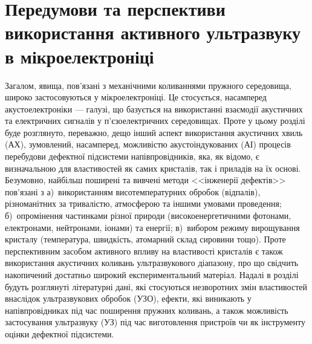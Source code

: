 \chapter{Передумови та перспективи використання активного ультразвуку в мікроелектроніці\label{Oglyad}}


Загалом, явища, пов'язані з механічними коливаннями пружного середовища, широко застосовуються у мікроелектроніці.
Це стосується, насамперед акустоелектроніки --- галузі, що базується на використанні взаємодії акустичних та електричних сигналів у п'єзоелектричних середовищах.
Проте у цьому розділі буде розглянуто, переважно, дещо інший аспект використання акустичних хвиль (АХ),
зумовлений, насамперед, можливістю акустоіндукованих (АІ) процесів перебудови дефектної підсистеми напівпровідників, яка, як відомо, є визначальною для властивостей як самих кристалів, так і приладів на їх основі.
Безумовно, найбільш поширені та вивчені методи <<інженерії дефектів>> пов'язані з
а)~використанням висотемпературних обробок (відпалів), різноманітних за тривалістю, атмосферою та іншими умовами проведення;
б)~опромінення частинками різної природи (високоенергетичними фотонами, електронами, нейтронами, іонами) та енергії;
в)~вибором режиму вирощування кристалу (температура, швидкість, атомарний склад сировини тощо).
Проте перспективним засобом активного впливу на властивості кристалів є також використання акустичних коливань ультразвукового діапазону, про що свідчить накопичений достатньо широкий експериментальний матеріал.
Надалі в розділі будуть розглянуті літературні дані, які стосуються незворотних змін властивостей внаслідок ультразвукових обробок (УЗО), ефекти, які виникають у напівпровідниках під час поширення пружних коливань,
а також можливість застосування ультразвуку (УЗ) під час виготовлення пристроїв чи як інструменту оцінки дефектної підсистеми.


